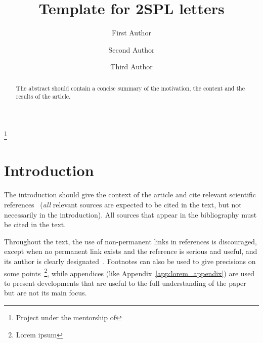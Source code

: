 \documentclass[
 reprint,
 preprintnumbers,
 nobibnotes,
 nofootinbib,
 longbibliography,
 amsmath,amssymb,
 aps,pra
]{revtex4-2}
\renewcommand{\journalname}{Strasbourg Students Physical Letters}
\renewcommand{\volumename}{X}
\renewcommand{\numbername}{01xx}
\newcommand{\header}{{\footnotesize\today} \hspace{7em} {\sc\journalname} \; {\bf\volumename},\; \numbername \; \hspace{9em} {\footnotesize CC BY-SA 4.0}}
\begin{document}
\preprint{\header}%



\title{Template for 2SPL letters}
\thanks{Project under the mentorship of}%

\author{First Author}

\author{Second Author}

\author{Third Author}

\begin{abstract}
    The abstract should contain a concise summary of the motivation, the content and the results of the article.
\end{abstract}

\maketitle


\section*{Introduction}

The introduction should give the context of the article and cite relevant scientific references~\cite{wheeler1949electrodynamics,beaudoin2024extending,martin2002historyspinstatistics,landauQuantum} ({\em all} relevant sources are expected to be cited in the text, but not necessarily in the introduction). All sources that appear in the bibliography must be cited in the text.

Throughout the text, the use of non-permanent links in references is discouraged, except when no permanent link exists and the reference is serious and useful, and its author is clearly designated~\cite{skinner2018qft}. Footnotes can also be used to give precisions on some points~\footnote{Lorem ipsum}, while appendices (like Appendix~\ref{app:lorem_appendix}) are used to present developments that are useful to the full understanding of the paper but are not its main focus.
\end{document}
